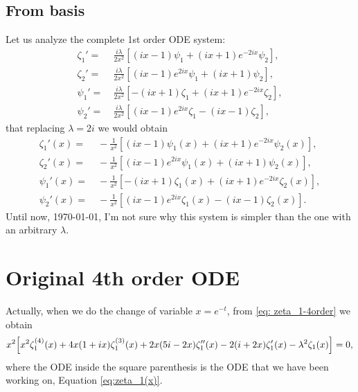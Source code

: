 \documentclass[%
 aip,
 jmp,%
 amsmath,amssymb,
 reprint,%
]{revtex4-2}
\begin{document}
\subsection{From basis}

Let us analyze the complete 1st order ODE system:
\begin{equation}
\begin{aligned}
    \zeta_1'= &~{} \frac{i\lambda }{2x^2} \left[ \left(ix- 1\right)\psi_1 +\left(ix+ 1\right)e^{-2i x}\psi_2 \right], \\
    \zeta_2'=&~{}  \frac{i\lambda}{2x^2} \left[ \left(ix-1\right)e^{2i x}\psi_1 + \left(ix+ 1\right)\psi_2 \right], \\
    \psi_1'= &~{}  \frac{i\lambda}{2x^2} \left[- \left(ix + 1\right)\zeta_1 +\left(ix + 1\right)e^{-2i x}\zeta_2 \right], \\
    \psi_2'=&~{}  \frac{i\lambda}{2x^2} \left[ \left(ix - 1\right)e^{2i x}\zeta_1 - \left(ix - 1\right)\zeta_2 \right],
\end{aligned}
\end{equation}
that replacing $\lambda = 2i$ we would obtain
\begin{equation}
\begin{aligned}
    \zeta_1'(x) = &~{} -\frac{1}{x^2} \left[ \left(ix- 1\right)\psi_1(x) +\left(ix+ 1\right)e^{-2i x}\psi_2(x) \right], \\
    \zeta_2'(x) =&~{}  -\frac{1}{x^2} \left[ \left(ix-1\right)e^{2i x}\psi_1(x) + \left(ix+ 1\right)\psi_2(x) \right], \\
    \psi_1'(x) = &~{}  -\frac{1}{x^2} \left[- \left(ix + 1\right)\zeta_1(x) +\left(ix + 1\right)e^{-2i x}\zeta_2(x) \right], \\
    \psi_2'(x) =&~{}  -\frac{1}{x^2} \left[ \left(ix - 1\right)e^{2i x}\zeta_1(x) - \left(ix - 1\right)\zeta_2(x) \right].
\end{aligned}
\end{equation}
Until now, \today, I'm not sure why this system is simpler than the one with an arbitrary $\lambda$.


\section{Original 4th order ODE}

Actually, when we do the change of variable $x = e^{-t}$, from \eqref{eq: zeta_1-4order} we obtain
\begin{equation}
x^2\qty[x^2\zeta_1^{(4)}(x) + 4x(1+ ix)\zeta_1^{(3)}(x) + 2x (5i-2x)\zeta_1''(x) - 2(i+2x)\zeta_1'(x) - \lambda^2\zeta_1(x)]=0,
\end{equation}
where the ODE inside the square parenthesis is the ODE that we have been working on, Equation \eqref{eq:zeta_1(x)}.
\end{document}

